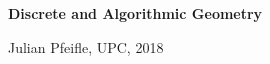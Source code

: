 \documentclass[11pt]{amsart}
\begin{document}
\begin{center}
\textbf{\sffamily
   Discrete and Algorithmic Geometry }

\medskip
   Julian Pfeifle,
   UPC, 2018
\end{center}

\nocite{richter-2011,bokowski-richter-sturmfels-1990,bokowski-richter-1990,gelfand-goresky-mcpherson-serganova-1987,om2,firsching-2018,grunbaum-2003}



\end{document}
